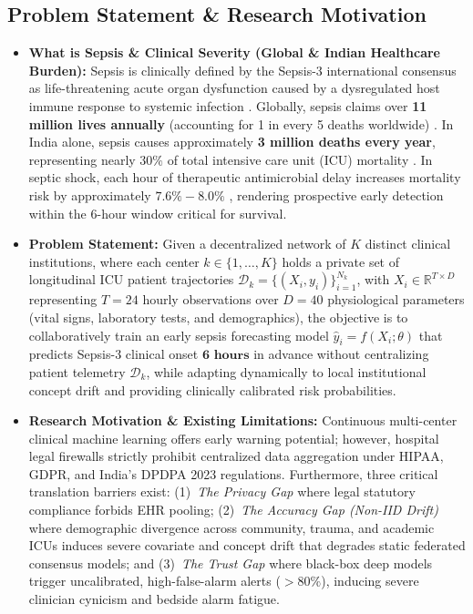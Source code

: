 \documentclass[11pt, a4paper]{article}
\begin{document}
\subsection{Problem Statement \& Research Motivation}
\begin{itemize}[noitemsep, topsep=2pt]
    \item \textbf{What is Sepsis \& Clinical Severity (Global \& Indian Healthcare Burden):} Sepsis is clinically defined by the Sepsis-3 international consensus as life-threatening acute organ dysfunction caused by a dysregulated host immune response to systemic infection \cite{singer2016third}. Globally, sepsis claims over \textbf{11 million lives annually} (accounting for 1 in every 5 deaths worldwide) \cite{rudd2020global}. In India alone, sepsis causes approximately \textbf{3 million deaths every year}, representing nearly $30\%$ of total intensive care unit (ICU) mortality \cite{chatterjee2022burden}. In septic shock, each hour of therapeutic antimicrobial delay increases mortality risk by approximately $\mathbf{7.6\% - 8.0\%}$ \cite{kumar2006duration}, rendering prospective early detection within the 6-hour window critical for survival.
    \item \textbf{Problem Statement:} Given a decentralized network of $K$ distinct clinical institutions, where each center $k \in \{1, \dots, K\}$ holds a private set of longitudinal ICU patient trajectories $\mathcal{D}_k = \{(X_i, y_i)\}_{i=1}^{N_k}$, with $X_i \in \mathbb{R}^{T \times D}$ representing $T = 24$ hourly observations over $D = 40$ physiological parameters (vital signs, laboratory tests, and demographics), the objective is to collaboratively train an early sepsis forecasting model $\hat{y}_i = f(X_i; \theta)$ that predicts Sepsis-3 clinical onset $\mathbf{6\text{ hours}}$ in advance without centralizing patient telemetry $\mathcal{D}_k$, while adapting dynamically to local institutional concept drift and providing clinically calibrated risk probabilities.
    \item \textbf{Research Motivation \& Existing Limitations:} Continuous multi-center clinical machine learning offers early warning potential; however, hospital legal firewalls strictly prohibit centralized data aggregation under HIPAA, GDPR, and India's DPDPA 2023 regulations. Furthermore, three critical translation barriers exist: (1)~\textit{The Privacy Gap} where legal statutory compliance forbids EHR pooling; (2)~\textit{The Accuracy Gap (Non-IID Drift)} where demographic divergence across community, trauma, and academic ICUs induces severe covariate and concept drift that degrades static federated consensus models; and (3)~\textit{The Trust Gap} where black-box deep models trigger uncalibrated, high-false-alarm alerts ($>80\%$), inducing severe clinician cynicism and bedside alarm fatigue.

\end{itemize}
\end{document}
